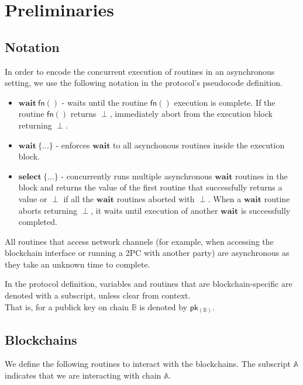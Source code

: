 \documentclass{article}      	%
\begin{document}
\section{Preliminaries}

\subsection{Notation}

In order to encode the concurrent execution of routines in an asynchronous setting, we use the following notation in the protocol's pseudocode definition.
\begin{itemize}[nosep, noitemsep]
    \item $\mathbf{wait} \: \mathsf{fn}()$ - waits until the routine $\mathsf{fn}()$ execution is complete. If the routine $\mathsf{fn}()$ returns $\perp$, immediately abort from the execution block returning $\perp$. \\
    \item $\mathbf{wait} \: \{...\}$ - enforces $\mathbf{wait}$ to all asynchonous routines inside the execution block. \\
    \item $\mathbf{select} \: \{...\}$ - concurrently runs multiple asynchronous $\mathbf{wait}$ routines in the block and returns the value of the first routine that successfully returns a value or $\perp$ if all the $\mathbf{wait}$ routines aborted with $\perp$. When a $\mathbf{wait}$ routine aborts returning $\perp$, it waits until execution of another $\mathbf{wait}$ is successfully completed. \\
\end{itemize}

All routines that access network channels (for example, when accessing the blockchain interface or running a 2PC with another party) are asynchronous as they take an unknown time to complete.

In the protocol definition, variables and routines that are blockchain-specific are denoted with a subscript, unless clear from context. \\
That is, for a publick key on chain $\mathbb{B}$ is denoted by $\mathsf{pk_{(\mathbb{B})}}$. \\

\subsection{Blockchains}

We define the following routines to interact with the blockchains. The subscript $\mathbb{A}$ indicates that we are interacting with chain $\mathbb{A}$.
\end{document}
